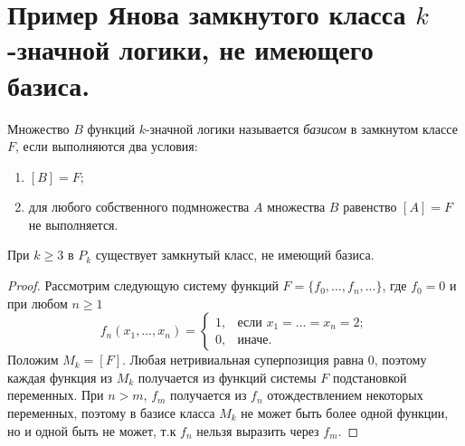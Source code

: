 \section{Пример Янова замкнутого класса $k$-значной логики, не имеющего базиса.}

\begin{definition}
    Множество $B$ функций $k$-значной логики называется \textit{базисом} в замкнутом классе $F$, если выполняются два условия:
    \begin{enumerate}[nolistsep]
        \item $[B] = F$;
        \item для любого собственного подмножества $A$ множества $B$ равенство $[A] = F$ не выполняется.
    \end{enumerate}
\end{definition}

\begin{theorem}[Ю.\,И\,Янов]
    При $k \geqslant 3$ в $P_k$ существует замкнутый класс, не имеющий базиса.
\end{theorem}

\begin{proof}
    Рассмотрим следующую систему функций $F = \{f_0, \ldots, f_n, \ldots\}$, где $f_0 = 0$ и при любом $n\geqslant 1$
    \[
        f_n(x_1, \ldots, x_n) = 
        \begin{cases}
            1,&\text{если $x_1 = \ldots = x_n = 2$};\\
            0,&\text{иначе.}
        \end{cases}
    \]
    Положим $M_k = [F]$. Любая нетривиальная суперпозиция равна 0, поэтому каждая функция из $M_k$ получается из функций системы $F$ подстановкой переменных. При $n > m$, $f_m$ получается из $f_n$ отождествлением некоторых переменных, поэтому в базисе класса $M_k$ не может быть более одной функции, но и одной быть не может, т.к $f_n$ нельзя выразить через $f_m$.
\end{proof}
